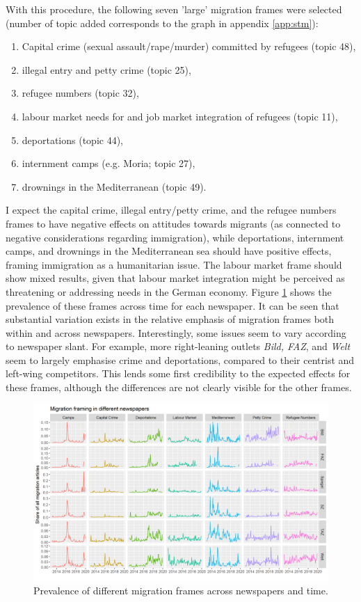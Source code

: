 \documentclass{article}
\begin{document}
With this procedure, the following seven 'large' migration frames were selected (number of topic added corresponds to the graph in appendix \ref{app:stm}):

\begin{enumerate}
    \item Capital crime (sexual assault/rape/murder) committed by refugees (topic 48), 
    \item illegal entry and petty crime (topic 25),
    \item refugee numbers (topic 32),
    \item labour market needs for and job market integration of refugees (topic 11),
    \item deportations (topic 44),
    \item internment camps (e.g. Moria; topic 27),
    \item drownings in the Mediterranean (topic 49).
\end{enumerate}

I expect the capital crime, illegal entry/petty crime, and the refugee numbers frames to have negative effects on attitudes towards migrants (as connected to negative considerations regarding immigration), while deportations, internment camps, and drownings in the Mediterranean sea should have positive effects, framing immigration as a humanitarian issue. The labour market frame should show mixed results, given that labour market integration might be perceived as threatening or addressing needs in the German economy. Figure \ref{fig:frames} shows the prevalence of these frames across time for each newspaper. It can be seen that substantial variation exists in the relative emphasis of migration frames both within and across newspapers. Interestingly, some issues seem to vary according to newspaper slant. For example, more right-leaning outlets \textit{Bild, FAZ}, and \textit{Welt} seem to largely emphasise crime and deportations, compared to their centrist and left-wing competitors. This lends some first credibility to the expected effects for these frames, although the differences are not clearly visible for the other frames.

\begin{figure}[!ht]
    \centering
    \includegraphics[width=\textwidth]{paper/vis/frames_papers.png}
    \caption{Prevalence of different migration frames across newspapers and time.}
    \label{fig:frames}
\end{figure}
\end{document}
